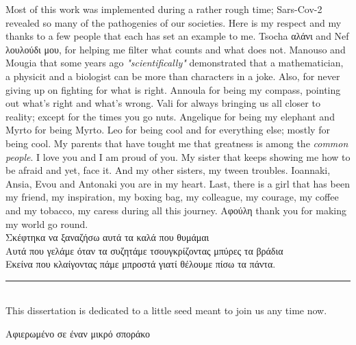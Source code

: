 \documentclass[master=elt, cleveref, autoref, masteroption=eg]{kulemt}
\begin{document}
\begin{preface}
   Most of this work was implemented during a rather rough time;
   Sars-Cov-2 revealed so many of the pathogenies of our societies.
   Here is my respect and my thanks to a few people that each has set an example to me.
   Tsocha \foreignlanguage{greek}{αλάνι} and Nef \foreignlanguage{greek}{λουλούδι μου},
   for helping me filter what counts and what does not. 
   Manouso and Mougia that some years ago \textit{"scientifically"} demonstrated that 
   a mathematician, a physicit and a biologist can be more than characters in a joke.
   Also, for never giving up on fighting for what is right. 
   Annoula for being my compass, 
   pointing out what's right and what's wrong. 
   Vali for always bringing us all closer to reality; except for the times you go nuts.  
   Angelique for being my elephant and Myrto for being Myrto.  
   Leo for being cool and for everything else; mostly for being cool.  
   My parents that have tought me that greatness is among the \textit{common people}.  
   I love you and I am proud of you.
   My sister that keeps showing me how to be afraid and yet, face it.
   And my other sisters, my tween troubles. 
   Ioannaki, Ansia, Evou and Antonaki
   you are in my heart.
   Last, there is a girl that has been my friend, my inspiration, 
   my boxing bag, my colleague, my courage, my coffee and my tobacco, my caress during all this journey. 
   \foreignlanguage{greek}{Αφούλη} thank you for making my world go round. \\

   \foreignlanguage{greek}{
      \hspace*{\fill} Σκέφτηκα να ξαναζήσω αυτά τα καλά που θυμάμαι \\
      \hspace*{\fill} Αυτά που γελάμε όταν τα συζητάμε τσουγκρίζοντας μπύρες τα βράδια \\
      \hspace*{\fill} Εκείνα που κλαίγοντας πάμε μπροστά γιατί θέλουμε πίσω τα πάντα.
   }
   
   \noindent\hfil\rule{0.5\textwidth}{.4pt}\hfil \\

   This dissertation is dedicated to a little seed meant to join us any time now.
   
   \foreignlanguage{greek}{Αφιερωμένο σε έναν μικρό σποράκο } 

\end{preface}
\fi 
\end{document}
